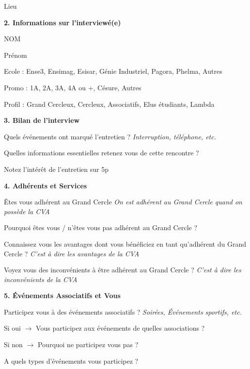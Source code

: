 \documentclass[a4paper, 11px]{article}
\begin{document}
	Lieu

\vspace{.3cm}

 \textbf {\large 2. Informations sur l'interviewé(e)}

	NOM
	
	Prénom
	
	Ecole : 
	 Ense3,
	 Ensimag,
	 Esisar,
	 Génie Industriel,
	 Pagora,
	 Phelma,
	 Autres
	
	Promo :
	 1A,
	 2A,
	 3A,
	 4A ou +,
	 Césure,
	 Autres
	
	Profil : 
	 Grand Cercleux,
	 Cercleux,
	 Associatifs,
	 Elus étudiants,
	 Lambda

\vspace{.3cm}

 \textbf {\large 3. Bilan de l'interview}

Quels événements ont marqué l'entretien ?
\textit{Interruption, téléphone, etc.}

Quelles informations essentielles retenez vous de cette rencontre ?

Notez l'intérêt de l'entretien sur 5p


\vspace{.3cm}

 \textbf {\large 4. Adhérents et Services}

Êtes vous adhérent au Grand Cercle
\textit{On est adhérent au Grand Cercle quand on possède la CVA}

Pourquoi êtes vous / n'êtes vous pas adhérent au Grand Cercle ?

Connaissez vous les avantages dont vous bénéficiez en tant qu'adhérent du Grand Cercle ?
\textit{C'est à dire les avantages de la CVA}

Voyez vous des inconvénients à être adhérent au Grand Cercle ?
\textit{C'est à dire les inconvénients de la CVA}


\vspace{.2cm}
 \textbf {\large 5. Événements Associatifs et Vous}

Participez vous à des événements associatifs ?
\textit{Soirées, Événements sportifs, etc.}

Si oui $\rightarrow$ Vous participez aux événements de quelles associations ?

Si non $\rightarrow$ Pourquoi ne participez vous pas ?

A quels types d'événements vous participez ?


\vspace{.3cm}
\end{document}
